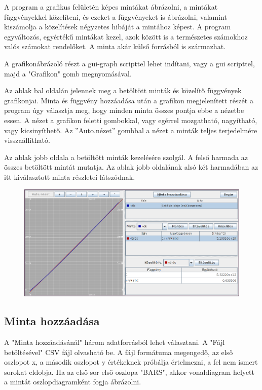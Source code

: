 A program a grafikus felületén képes mintákat ábrázolni, a mintákat függvényekkel
közelíteni, és ezeket a függvényeket is ábrázolni, valamint kiszámolja a közelítések
négyzetes hibáját a mintához képest.
A program egyváltozós, egyértékű mintákat kezel,
azok között is a természetes számokhoz valós számokat
rendelőket.
A minta akár külső forrásból is származhat.

A grafikonábrázoló részt a gui-graph scripttel lehet indítani,
vagy a gui scripttel, majd a "Grafikon" gomb megnyomásával.

Az ablak bal oldalán jelennek meg a betöltött minták és közelítő függvények
grafikonjai. Minta és függvény hozzáadása után a grafikon megjelenített részét
a program úgy választja meg, hogy minden minta összes pontja ebbe a nézetbe essen.
A nézet a grafikon feletti gombokkal, vagy egérrel mozgatható, nagyítható, vagy
kicsinyíthető.
Az ''Auto.nézet'' gombbal a nézet a minták teljes terjedelmére visszaállítható.

Az ablak jobb oldala a betöltött minták kezelésére szolgál.
A felső harmada az összes betöltött mintát mutatja.
Az ablak jobb oldalának alsó két harmadában az itt kiválasztott minta részletei
látszódnak.

\begin{figure}[h]
\centering
\includegraphics[scale=0.5]{graph.png}
\end{figure}

\subsection{Minta hozzáadása} %

A "Minta hozzáadásánál" három adatforrásból lehet választani.
A "Fájl betöltésével" CSV fájl olvasható be. A fájl formátuma megengedő, az első oszlopot x, a második oszlopot y értékeknek próbálja értelmezni, a fel nem ismert sorokat eldobja.
Ha az első sor első oszlopa "BARS",
akkor vonaldiagram helyett a mintát oszlopdiagramként fogja ábrázolni.

